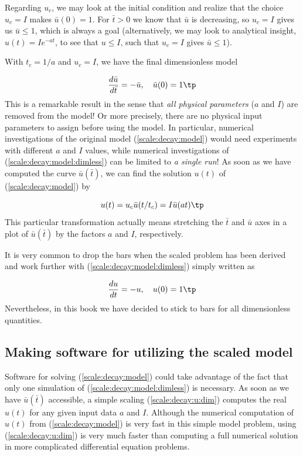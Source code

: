 \documentclass[graybox,envcountchap,sectrefs,final]{svmonodo}
\begin{document}
Regarding $u_c$, we may look at the initial condition
and realize that the choice $u_c=I$ makes $\bar u(0)=1$. For $\bar t>0$
we know that $\bar u$ is decreasing, so $u_c=I$
gives us $\bar u\leq 1$, which is always a goal
(alternatively, we may look to analytical insight, $u(t)=Ie^{-at}$, to
see that $u\leq I$, such that $u_c=I$ gives $\bar u\leq 1$).

With $t_c=1/a$ and $u_c=I$, we have the final dimensionless model

\begin{equation}
\frac{d\bar u}{d\bar t} = -\bar u,\quad \bar u(0)=1
\tp
\label{scale:decay:model:dimless}
\end{equation}
This is a remarkable result in the sense that \emph{all physical parameters}
($a$ and $I$)
are removed from the model! Or more precisely, there are no physical input
parameters to assign
before using the model. In particular, numerical investigations of the original
model (\ref{scale:decay:model}) would need experiments with different
$a$ and $I$ values, while numerical investigations of
(\ref{scale:decay:model:dimless}) can be limited to \emph{a single run}! As soon
as we have computed the curve $\bar u(\bar t)$, we can find the
solution $u(t)$ of (\ref{scale:decay:model}) by

\begin{equation}
u(t) = u_c\bar u(t/t_c) = I\bar u(at)
\tp
\label{scale:decay:u:dim}
\end{equation}
This particular transformation actually means stretching the $\bar t$ and
$\bar u$ axes in a plot of $\bar u(\bar t)$ by the factors $a$ and $I$,
respectively.

It is very common to drop the bars when the scaled problem has been
derived and work further with (\ref{scale:decay:model:dimless}) simply
written as

\[
\frac{du}{dt} = -u,\quad u(0)=1
\tp
\]
Nevertheless, in this book we have decided to stick to bars for all
dimensionless quantities.


\subsection{Making software for utilizing the scaled model}
\label{sec:scale:decay:prog}

Software for solving (\ref{scale:decay:model}) could take advantage
of the fact that only one simulation of (\ref{scale:decay:model:dimless})
is necessary. As soon as we have $\bar u(\bar t)$ accessible,
a simple scaling (\ref{scale:decay:u:dim}) computes the real $u(t)$
for any given input data $a$ and $I$. Although the numerical computation of
$u(t)$ from (\ref{scale:decay:model}) is very fast in this simple model
problem, using (\ref{scale:decay:u:dim}) is very much faster than
computing a full numerical solution in more complicated
differential equation problems.
\end{document}
